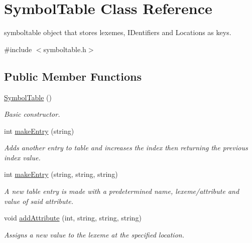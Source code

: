 \hypertarget{classSymbolTable}{
\section{SymbolTable Class Reference}
\label{classSymbolTable}
}


symboltable object that stores lexemes, IDentifiers and Locations as keys.  




{\ttfamily \#include $<$symboltable.h$>$}

\subsection*{Public Member Functions}
\begin{DoxyCompactItemize}
\item 
\hyperlink{classSymbolTable_a1fbe6cec5594463b766db0ac58c9aa1d}{SymbolTable} ()
\begin{DoxyCompactList}\small\item\em Basic constructor. \item\end{DoxyCompactList}\item 
int \hyperlink{classSymbolTable_a1df7dfc3592c924e8c8a9fea1e13bf89}{makeEntry} (string)
\begin{DoxyCompactList}\small\item\em Adds another entry to table and increases the index then returning the previous index value. \item\end{DoxyCompactList}\item 
int \hyperlink{classSymbolTable_a064e30f7ddbd4065244d1d41ea885737}{makeEntry} (string, string, string)
\begin{DoxyCompactList}\small\item\em A new table entry is made with a predetermined name, lexeme/attribute and value of said attribute. \item\end{DoxyCompactList}\item 
void \hyperlink{classSymbolTable_ac7a86e820025627863b4277cf84353a0}{addAttribute} (int, string, string, string)
\begin{DoxyCompactList}\small\item\em Assigns a new value to the lexeme at the specified location. \item\end{DoxyCompactList}\item 

\end{DoxyCompactItemize}
